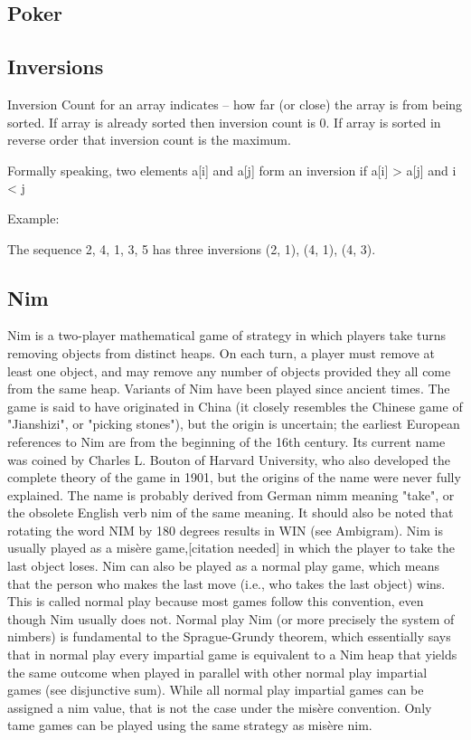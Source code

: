 \documentclass[10pt,letterpaper,twocolumn,twosided]{article}
\newcommand{\codigofuente}[1]{

\dotfill
}
\begin{document}
\subsection{Poker}

\codigofuente{src/misc/poker.cpp}

\subsection{Inversions}

Inversion Count for an array indicates – how far (or close) the array is from being sorted. If array is already sorted then inversion count is 0. If array is sorted in reverse order that inversion count is the maximum.

Formally speaking, two elements a[i] and a[j] form an inversion if a[i] > a[j] and i < j

Example:

The sequence 2, 4, 1, 3, 5 has three inversions (2, 1), (4, 1), (4, 3).

\codigofuente{src/misc/inversions.cpp}

\subsection{Nim}

Nim is a two-player mathematical game of strategy in which players take turns removing objects from distinct heaps. On each turn, a player must remove at least one object, and may remove any number of objects provided they all come from the same heap.
Variants of Nim have been played since ancient times. The game is said to have originated in China (it closely resembles the Chinese game of "Jianshizi", or "picking stones"), but the origin is uncertain; the earliest European references to Nim are from the beginning of the 16th century. Its current name was coined by Charles L. Bouton of Harvard University, who also developed the complete theory of the game in 1901, but the origins of the name were never fully explained. The name is probably derived from German nimm meaning "take", or the obsolete English verb nim of the same meaning. It should also be noted that rotating the word NIM by 180 degrees results in WIN (see Ambigram).
Nim is usually played as a misère game,[citation needed] in which the player to take the last object loses. Nim can also be played as a normal play game, which means that the person who makes the last move (i.e., who takes the last object) wins. This is called normal play because most games follow this convention, even though Nim usually does not.
Normal play Nim (or more precisely the system of nimbers) is fundamental to the Sprague-Grundy theorem, which essentially says that in normal play every impartial game is equivalent to a Nim heap that yields the same outcome when played in parallel with other normal play impartial games (see disjunctive sum).
While all normal play impartial games can be assigned a nim value, that is not the case under the misère convention. Only tame games can be played using the same strategy as misère nim.
\end{document}
